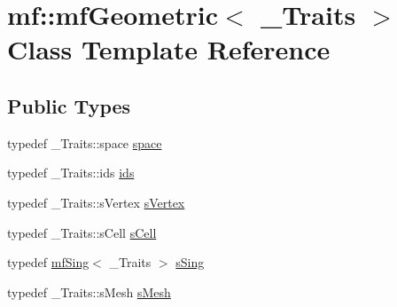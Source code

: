 \hypertarget{classmf_1_1mfGeometric}{
\section{mf::mfGeometric$<$ \_\-Traits $>$ Class Template Reference}
\label{classmf_1_1mfGeometric}
}
\subsection*{Public Types}
\begin{DoxyCompactItemize}
\item 
typedef \_\-Traits::space \hyperlink{classmf_1_1mfGeometric_a03504b73c011add763229b5bae6e137c}{space}
\item 
typedef \_\-Traits::ids \hyperlink{classmf_1_1mfGeometric_a15bbb64e3b03482d20c82fa2d4b68e56}{ids}
\item 
typedef \_\-Traits::sVertex \hyperlink{classmf_1_1mfGeometric_a6195106d9ab499c9c59532d804d6eacf}{sVertex}
\item 
typedef \_\-Traits::sCell \hyperlink{classmf_1_1mfGeometric_a59004ce8cd63aa64c7a6ce66eb6f0080}{sCell}
\item 
typedef \hyperlink{classmf_1_1mfSing}{mfSing}$<$ \_\-Traits $>$ \hyperlink{classmf_1_1mfGeometric_a1fe080907992c40828062aac0717fc13}{sSing}
\item 
typedef \_\-Traits::sMesh \hyperlink{classmf_1_1mfGeometric_a36b13b57c06fda7c04e3202ad1dae4d2}{sMesh}
\end{DoxyCompactItemize}
